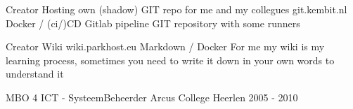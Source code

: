\documentclass[11pt, letterpaper]{awesome-cv}
\begin{document}
\begin{cventries}

  \cventry
    {Creator}
    {Hosting own (shadow) GIT repo for me and my collegues}
    {git.kembit.nl}
    {Docker / (ci/)CD Gitlab pipeline}
    {GIT repository with some runners}

  \cventry
    {Creator}
    {Wiki}
    {wiki.parkhost.eu}
    {Markdown / Docker}
    {For me my wiki is my learning process, sometimes you need to write it down in your own words to understand it}


\end{cventries}

\begin{cventries}

  \cventry
    {MBO 4 ICT - SysteemBeheerder}
    {Arcus College}
    {Heerlen}
    {2005 - 2010}
    {
    }


\end{cventries}

\end{document}
